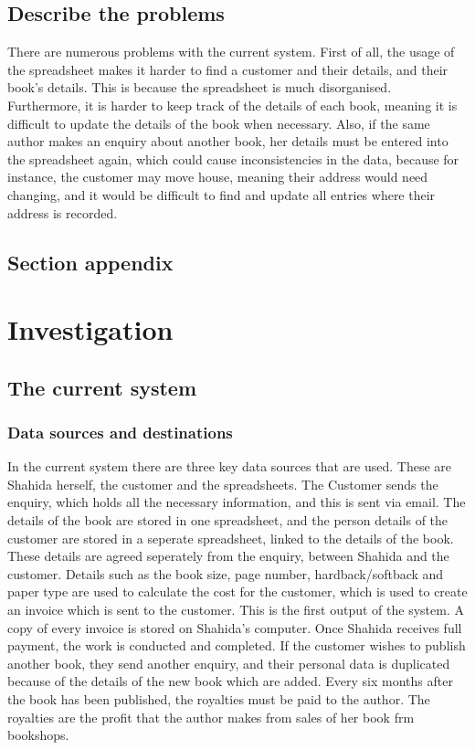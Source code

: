 \subsection{Describe the problems}
There are numerous problems with the current system. First of all, the usage of the spreadsheet makes it harder to find a customer and their details, and their book’s details. This is because the spreadsheet is much disorganised. Furthermore, it is harder to keep track of the details of each book, meaning it is difficult to update the details of the book when necessary. Also, if the same author makes an enquiry about another book, her details must be entered into the spreadsheet again, which could cause inconsistencies in the data, because for instance, the customer may move house, meaning their address would need changing, and it would be difficult to find and update all entries where their address is recorded.

\subsection{Section appendix}

\section{Investigation}

\subsection{The current system}

\subsubsection{Data sources and destinations}
In the current system there are three key data sources that are used. These are Shahida herself, the customer and the spreadsheets. The Customer sends the enquiry, which holds all the necessary information, and this is sent via email. The details of the book are stored in one spreadsheet, and the person details of the customer are stored in a seperate spreadsheet, linked to the details of the book. These details are agreed seperately from the enquiry, between Shahida and the customer. Details such as the book size, page number, hardback/softback and paper type are used to calculate the cost for the customer, which is used to create an invoice which is sent to the customer. This is the first output of the system. A copy of every invoice is stored on Shahida's computer. Once Shahida receives full payment, the work is conducted and completed. If the customer wishes to publish another book, they send another enquiry, and their personal data is duplicated because of the details of the new book which are added. Every six months after the book has been published, the royalties must be paid to the author. The royalties are the profit that the author makes from sales of her book frm bookshops.


